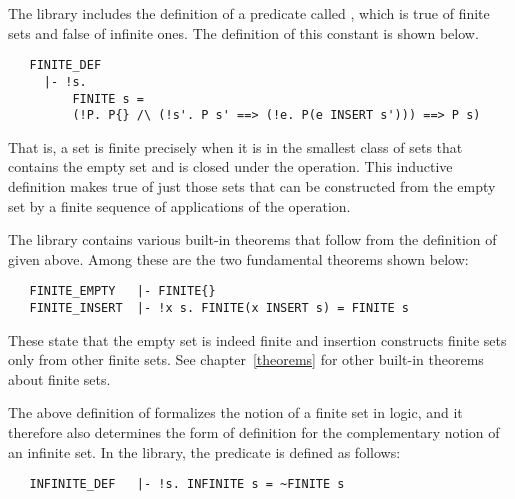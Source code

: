 The  library includes the definition of a predicate called
, which is true of finite sets and false of infinite ones.  The
definition of this constant is shown below.

\begin{hol}
\begin{verbatim}
   FINITE_DEF
     |- !s.
         FINITE s =
         (!P. P{} /\ (!s'. P s' ==> (!e. P(e INSERT s'))) ==> P s)
\end{verbatim}\end{hol}

\noindent That is, a set  is finite precisely when it is in the smallest
class of sets that contains the empty set and is closed under the 
operation.  This inductive definition makes  true of just those sets
that can be constructed from the empty set by a finite sequence of applications
of the  operation.

The  library contains various built-in theorems that follow from the
definition of  given above.  Among these are the two fundamental
theorems shown below:

\begin{hol}
\begin{verbatim}
   FINITE_EMPTY   |- FINITE{}
   FINITE_INSERT  |- !x s. FINITE(x INSERT s) = FINITE s
\end{verbatim}\end{hol}

\noindent These state that the empty set is indeed finite and insertion
constructs finite sets only from other finite sets. See chapter~\ref{theorems}
for other built-in theorems about finite sets.

The above definition of  formalizes the notion of a finite set in
logic, and it therefore also determines the form of definition for the
complementary notion of an infinite set. In the  library, the
predicate  is defined as follows:

\begin{hol}
\begin{verbatim}
   INFINITE_DEF   |- !s. INFINITE s = ~FINITE s
\end{verbatim}\end{hol}

